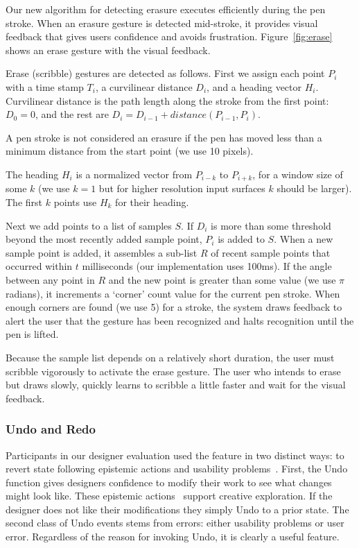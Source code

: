 \documentclass{article}
\begin{document}
Our new algorithm for detecting erasure executes efficiently during
the pen stroke. When an erasure gesture is detected mid-stroke, it
provides visual feedback that gives users confidence and avoids
frustration. Figure~\ref{fig:erase} shows an erase gesture with the
visual feedback.

Erase (scribble) gestures are detected as follows. First we assign
each point $P_i$ with a time stamp $T_i$, a curvilinear distance
$D_i$, and a heading vector $H_i$. Curvilinear distance is the path
length along the stroke from the first point: $D_0=0$, and the
rest are $D_i = D_{i-1} + distance(P_{i-1}, P_i)$.

A pen stroke is not considered an erasure if the pen has moved less
than a minimum distance from the start point (we use 10 pixels).

The heading $H_i$ is a normalized vector from $P_{i-k}$ to $P_{i+k}$,
for a window size of some $k$ (we use $k=1$ but for higher resolution
input surfaces $k$ should be larger). The first $k$ points use $H_k$
for their heading.

Next we add points to a list of samples $S$. If $D_i$ is more than
some threshold beyond the most recently added sample point, $P_i$ is
added to $S$. When a new sample point is added, it assembles a
sub-list $R$ of recent sample points that occurred within $t$
milliseconds (our implementation uses 100ms). If the angle between any
point in $R$ and the new point is greater than some value (we use
$\pi$ radians), it increments a `corner' count value for the current
pen stroke. When enough corners are found (we use 5) for a stroke, the
system draws feedback to alert the user that the gesture has been
recognized and halts recognition until the pen is lifted.

Because the sample list depends on a relatively short duration, the
user must scribble vigorously to activate the erase gesture. The user
who intends to erase but draws slowly, quickly learns to scribble a
little faster and wait for the visual feedback.

\subsubsection{Undo and Redo}

Participants in our designer evaluation used the feature in two
distinct ways: to revert state following epistemic actions and
usability problems~\cite{akers-undo}. First, the Undo function gives
designers confidence to modify their work to see what changes might
look like. These epistemic actions~\cite{kirsch-epistemic-action}
support creative exploration. If the designer does not like their
modifications they simply Undo to a prior state. The second class of
Undo events stems from errors: either usability problems or user
error. Regardless of the reason for invoking Undo, it is clearly a
useful feature. 
\end{document}
